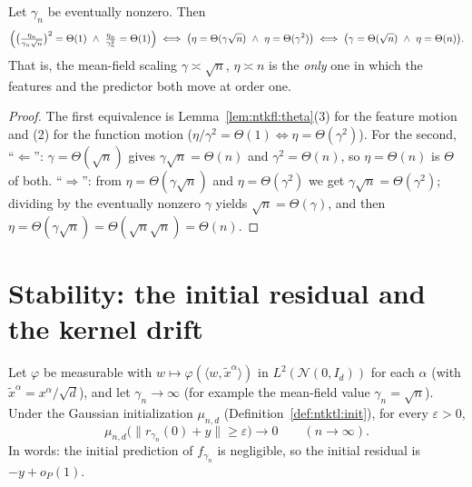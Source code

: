\begin{theorem}\label{thm:ntkfl:balance}
  \leanok
Let $\gamma_n$ be eventually nonzero. Then
\[
  \Bigl(\bigl(\tfrac{\eta_n}{\gamma_n\sqrt n}\bigr)^2=\Theta(1)\ \wedge\ \tfrac{\eta_n}{\gamma_n^2}=\Theta(1)\Bigr)
  \iff\bigl(\eta=\Theta(\gamma\sqrt n)\ \wedge\ \eta=\Theta(\gamma^2)\bigr)
  \iff\bigl(\gamma=\Theta(\sqrt n)\ \wedge\ \eta=\Theta(n)\bigr).
\]
That is, the mean-field scaling $\gamma\asymp\sqrt n$, $\eta\asymp n$ is the \emph{only} one in which the features and the predictor both move at order one.
\end{theorem}

\begin{proof}
  \leanok
The first equivalence is Lemma~\ref{lem:ntkfl:theta}(3) for the feature motion and (2) for the function motion ($\eta/\gamma^2=\Theta(1)\iff\eta=\Theta(\gamma^2)$).
For the second, ``$\Leftarrow$'': $\gamma=\Theta(\sqrt n)$ gives $\gamma\sqrt n=\Theta(n)$ and $\gamma^2=\Theta(n)$, so $\eta=\Theta(n)$ is $\Theta$ of both. ``$\Rightarrow$'': from
$\eta=\Theta(\gamma\sqrt n)$ and $\eta=\Theta(\gamma^2)$ we get $\gamma\sqrt n=\Theta(\gamma^2)$; dividing by the eventually nonzero $\gamma$ yields $\sqrt n=\Theta(\gamma)$, and then $\eta=\Theta(\gamma\sqrt n)=\Theta(\sqrt n\sqrt n)=\Theta(n)$.
\end{proof}


\section{Stability: the initial residual and the kernel drift}\label{sec:ntkfl:stability}

\begin{theorem}\label{thm:ntkfl:initialResidual}
  \leanok
Let $\varphi$ be measurable with $w\mapsto\varphi(\langle w,\tilde x^\alpha\rangle)$ in $L^2(\mathcal N(0,I_d))$ for each $\alpha$ (with $\tilde x^\alpha=x^\alpha/\sqrt d$), and let $\gamma_n\to\infty$ (for example the mean-field value $\gamma_n=\sqrt n$).
Under the Gaussian initialization $\mu_{n,d}$ (Definition~\ref{def:ntktl:init}), for every $\varepsilon>0$,
\[
  \mu_{n,d}\bigl(\|r_{\gamma_n}(0)+y\|\ge\varepsilon\bigr)\longrightarrow0\qquad(n\to\infty).
\]
In words: the initial prediction of $f_{\gamma_n}$ is negligible, so the initial residual is $-y+o_P(1)$.
\end{theorem}


